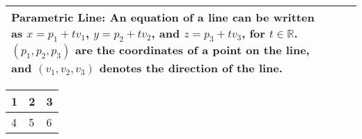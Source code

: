 \begin{tabular}{|m{.31\linewidth}|m{.31\linewidth}|m{.31\linewidth}|}
\textbf{Parametric Line}:
    An equation of a line can be written as $ x = p_1 + tv_1 $,
    $ y = p_2 + tv_2 $, and $ z = p_3 + tv_3 $, for $ t \in \mathbb{R} $.
    $ (p_1, p_2, p_3) $ are the coordinates of a point on the line, and
    $ (v_1, v_2, v_3) $ denotes the direction of the line. \\

\hline

\end{tabular}
\clearpage
\begin{tabular}{|m{.31\linewidth}|m{.31\linewidth}|m{.31\linewidth}|}
    \hline
    1 & 2 & 3 \\
    \hline
    4 & 5 & 6 \\
    \hline
\end{tabular}


